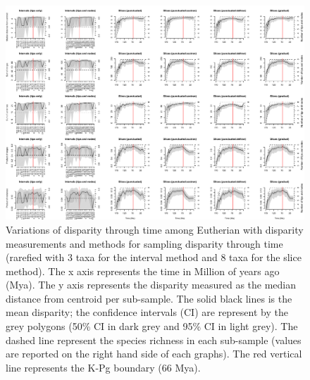 \begin{landscape}
\begin{figure}[!htbp]
\centering
    \includegraphics[width=\textwidth,height=\textheight,keepaspectratio]{Supplementaries/Figures/STD/Eutheria_all_methods_rarefied.pdf}
\caption[Comparison of all the disparity metrics and all the time series methods for Eutheria (rarefied)]{Variations of disparity through time among Eutherian with disparity measurements and methods for sampling disparity through time (rarefied with 3 taxa for the interval method and 8 taxa for the slice method). The x axis represents the time in Million of years ago (Mya). The y axis represents the disparity measured as the median distance from centroid per sub-sample. The solid black lines is the mean disparity; the confidence intervals (CI) are represent by the grey polygons (50\% CI in dark grey and 95\% CI in light grey). The dashed line represent the species richness in each sub-sample (values are reported on the right hand side of each graphs). The red vertical line represents the K-Pg boundary (66 Mya).}
\label{Supp_disparity_all_Eutheria_rarefied}

\end{figure}
\end{landscape}